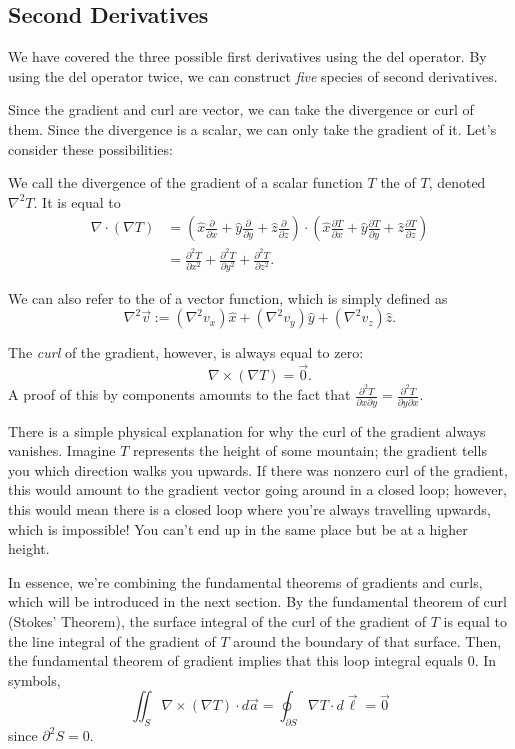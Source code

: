 \subsection{Second Derivatives}

We have covered the three possible first derivatives using the del operator. By using the del operator twice, we can construct \textit{five} species of second derivatives.

Since the gradient and curl are vector, we can take the divergence or curl of them. Since the divergence is a scalar, we can only take the gradient of it. Let's consider these possibilities:

\begin{definition}
    We call the divergence of the gradient of a scalar function $T$ the  of $T$, denoted $\nabla^2T$. It is equal to
    \begin{align*}
    \nabla\cdot(\nabla T)&=\left(\hat{x}\frac{\partial}{\partial x}+\hat{y}\frac{\partial}{\partial y}+\hat{z}\frac{\partial}{\partial z}\right)\cdot\left(\hat{x}\frac{\partial T}{\partial x}+\hat{y}\frac{\partial T}{\partial y}+\hat{z}\frac{\partial T}{\partial z}\right)\\
    &=\frac{\partial^2T}{\partial x^2}+\frac{\partial^2T}{\partial y^2}+\frac{\partial^2T}{\partial z^2}.
    \end{align*}
\end{definition}

\begin{definition}
    We can also refer to the  of a vector function, which is simply defined as
    \[\nabla^2\vec{v}:=(\nabla^2 v_x)\hat{x}+(\nabla^2 v_y)\hat{y}+(\nabla^2 v_z)\hat{z}.\]
\end{definition}
The \textit{curl} of the gradient, however, is always equal to zero:
\[\nabla\times(\nabla T)=\vec{0}.\]
A proof of this by components amounts to the fact that $\frac{\partial^2T}{\partial x\partial y}=\frac{\partial^2T}{\partial y\partial x}$.

\begin{remark}\label{remarkcurlgrad}
There is a simple physical explanation for why the curl of the gradient always vanishes. Imagine $T$ represents the height of some mountain; the gradient tells you which direction walks you upwards. If there was nonzero curl of the gradient, this would amount to the gradient vector going around in a closed loop; however, this would mean there is a closed loop where you're always travelling upwards, which is impossible! You can't end up in the same place but be at a higher height.

In essence, we're combining the fundamental theorems of gradients and curls, which will be introduced in the next section. By the fundamental theorem of curl (Stokes' Theorem), the surface integral of the curl of the gradient of $T$ is equal to the line integral of the gradient of $T$ around the boundary of that surface. Then, the fundamental theorem of gradient implies that this loop integral equals 0. In symbols,
\[\iint_S\nabla\times(\nabla T)\cdot d\vec{a}=\oint_{\partial S}\nabla T\cdot d\vec{\ell}=\vec{0}\]
since $\partial^2S=0$.
\end{remark}

